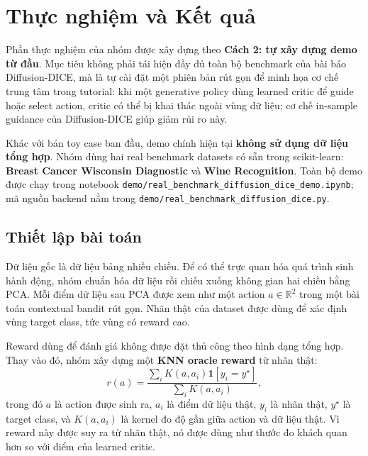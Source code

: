 
\section{Thực nghiệm và Kết quả}

Phần thực nghiệm của nhóm được xây dựng theo \textbf{Cách 2: tự xây dựng demo từ đầu}.
Mục tiêu không phải tái hiện đầy đủ toàn bộ benchmark của bài báo Diffusion-DICE, mà là
tự cài đặt một phiên bản rút gọn để minh họa cơ chế trung tâm trong tutorial: khi một
generative policy dùng learned critic để guide hoặc select action, critic có thể bị khai thác
ngoài vùng dữ liệu; cơ chế in-sample guidance của Diffusion-DICE giúp giảm rủi ro này.

Khác với bản toy case ban đầu, demo chính hiện tại \textbf{không sử dụng dữ liệu tổng hợp}.
Nhóm dùng hai real benchmark datasets có sẵn trong scikit-learn: \textbf{Breast Cancer
Wisconsin Diagnostic} và \textbf{Wine Recognition}. Toàn bộ demo được chạy trong notebook
\texttt{demo/real\_benchmark\_diffusion\_dice\_demo.ipynb}; mã nguồn backend nằm trong
\texttt{demo/real\_benchmark\_diffusion\_dice.py}.

\subsection{Thiết lập bài toán}

Dữ liệu gốc là dữ liệu bảng nhiều chiều. Để có thể trực quan hóa quá trình sinh hành động,
nhóm chuẩn hóa dữ liệu rồi chiếu xuống không gian hai chiều bằng PCA. Mỗi điểm dữ liệu sau
PCA được xem như một action $a \in \mathbb{R}^2$ trong một bài toán contextual bandit rút
gọn. Nhãn thật của dataset được dùng để xác định vùng target class, tức vùng có reward cao.

Reward dùng để đánh giá không được đặt thủ công theo hình dạng tổng hợp. Thay vào đó, nhóm
xây dựng một \textbf{KNN oracle reward} từ nhãn thật:
\[
    r(a) =
    \frac{\sum_i K(a,a_i)\mathbf{1}[y_i = y^\star]}
         {\sum_i K(a,a_i)} ,
\]
trong đó $a$ là action được sinh ra, $a_i$ là điểm dữ liệu thật, $y_i$ là nhãn thật,
$y^\star$ là target class, và $K(a,a_i)$ là kernel đo độ gần giữa action và dữ liệu thật.
Vì reward này được suy ra từ nhãn thật, nó được dùng như thước đo khách quan hơn so với
điểm của learned critic.

